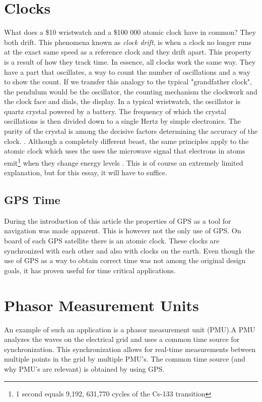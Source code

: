 \documentclass[12pt,english,a4paper]{article}
\begin{document}
\section{Clocks}
What does a \$10 wristwatch and a \$100 000 atomic clock have in common? They both drift. This phenomena known as \textit{clock drift}, is when a clock no longer runs at the exact same speed as a reference clock and they drift apart. This property is a result of how they track time. In essence, all clocks work the same way. They have a part that oscillates, a way to count the number of oscillations and a way to show the count. If we transfer this analogy to the typical "grandfather clock", the pendulum would be the oscillator, the counting mechanism the clockwork and the clock face and dials, the display. In a typical wristwatch, the oscillator is quartz crystal powered by a battery. The frequency of which the crystal oscillations is then divided down to a single Hertz by simple electronics. The purity of the crystal is among the decisive factors determining the accuracy of the clock. \cite{CSMG}. Although a completely different beast, the same principles apply to the atomic clock which uses the uses the microwave signal that electrons in atoms emit\footnote{1 second equals 9,192, 631,770 cycles of the Cs-133 transition\cite{HP}} when they change energy levels \cite{HP}. This is of course an extremely limited explanation, but for this essay, it will have to suffice.

\subsection{GPS Time}
During the introduction of this article the properties of GPS as a tool for navigation was made apparent. This is however not the only use of GPS. On board of each GPS satellite there is an atomic clock. These clocks are synchronized with each other and also with clocks on the earth. Even though the use of GPS as a way to obtain correct time was not among the original design goals, it has proven useful for time critical applications. 

\section{Phasor Measurement Units}
An example of such an application is a phasor measurement unit (PMU).A PMU analyzes the waves on the electrical grid and uses a common time source for synchronization. This synchronization allows for real-time measurements between multiple points in the grid by multiple PMU's. The common time source (and why PMU's are relevant) is obtained by using GPS. \cite{YLJRNR}
\end{document}
